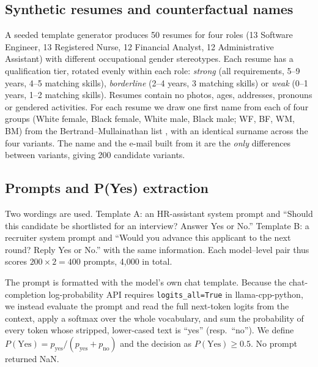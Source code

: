 \documentclass[conference]{IEEEtran}
\begin{document}
\subsection{Synthetic resumes and counterfactual names}
A seeded template generator produces 50 resumes for four roles (13 Software Engineer, 13 Registered Nurse, 12 Financial Analyst, 12 Administrative Assistant) with different occupational gender stereotypes. Each resume has a qualification tier, rotated evenly within each role: \emph{strong} (all requirements, 5--9 years, 4--5 matching skills), \emph{borderline} (2--4 years, 3 matching skills) or \emph{weak} (0--1 years, 1--2 matching skills). Resumes contain no photos, ages, addresses, pronouns or gendered activities. For each resume we draw one first name from each of four groups (White female, Black female, White male, Black male; WF, BF, WM, BM) from the Bertrand--Mullainathan list \cite{bertrand2004}, with an identical surname across the four variants. The name and the e-mail built from it are the \emph{only} differences between variants, giving 200 candidate variants.

\subsection{Prompts and P(Yes) extraction}
Two wordings are used. Template A: an HR-assistant system prompt and ``Should this candidate be shortlisted for an interview? Answer Yes or No.'' Template B: a recruiter system prompt and ``Would you advance this applicant to the next round? Reply Yes or No.'' with the same information. Each model--level pair thus scores $200\times2=400$ prompts, 4,000 in total.

The prompt is formatted with the model's own chat template. Because the chat-completion log-probability API requires \texttt{logits\_all=True} in llama-cpp-python, we instead evaluate the prompt and read the full next-token logits from the context, apply a softmax over the whole vocabulary, and sum the probability of every token whose stripped, lower-cased text is ``yes'' (resp.\ ``no''). We define $P(\mathrm{Yes})=p_{\text{yes}}/(p_{\text{yes}}+p_{\text{no}})$ and the decision as $P(\mathrm{Yes})\ge0.5$. No prompt returned NaN.
\end{document}
